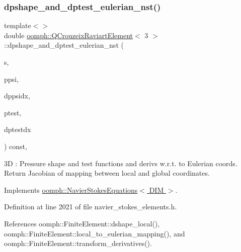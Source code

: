 \subsubsection{\texorpdfstring{dpshape\+\_\+and\+\_\+dptest\+\_\+eulerian\+\_\+nst()}{dpshape\_and\_dptest\_eulerian\_nst()}\hspace{0.1cm}{\footnotesize\ttfamily [3/3]}}
{\footnotesize\ttfamily template$<$$>$ \\
double \hyperlink{classoomph_1_1QCrouzeixRaviartElement}{oomph\+::\+Q\+Crouzeix\+Raviart\+Element}$<$ 3 $>$\+::dpshape\+\_\+and\+\_\+dptest\+\_\+eulerian\+\_\+nst (\begin{DoxyParamCaption}\item[{const \hyperlink{classoomph_1_1Vector}{Vector}$<$ double $>$ \&}]{s,  }\item[{\hyperlink{classoomph_1_1Shape}{Shape} \&}]{ppsi,  }\item[{\hyperlink{classoomph_1_1DShape}{D\+Shape} \&}]{dppsidx,  }\item[{\hyperlink{classoomph_1_1Shape}{Shape} \&}]{ptest,  }\item[{\hyperlink{classoomph_1_1DShape}{D\+Shape} \&}]{dptestdx }\end{DoxyParamCaption}) const\hspace{0.3cm}{\ttfamily [inline]}, {\ttfamily [virtual]}}

3D \+: Pressure shape and test functions and derivs w.\+r.\+t. to Eulerian coords. Return Jacobian of mapping between local and global coordinates. 

Implements \hyperlink{classoomph_1_1NavierStokesEquations_a2f3024a4d370ec45ddffacb236bc2bb2}{oomph\+::\+Navier\+Stokes\+Equations$<$ D\+I\+M $>$}.



Definition at line 2021 of file navier\+\_\+stokes\+\_\+elements.\+h.



References oomph\+::\+Finite\+Element\+::dshape\+\_\+local(), oomph\+::\+Finite\+Element\+::local\+\_\+to\+\_\+eulerian\+\_\+mapping(), and oomph\+::\+Finite\+Element\+::transform\+\_\+derivatives().

\mbox{\label{classoomph_1_1QCrouzeixRaviartElement_a3c4261300b81aae3ac358198b3e11906}} 
